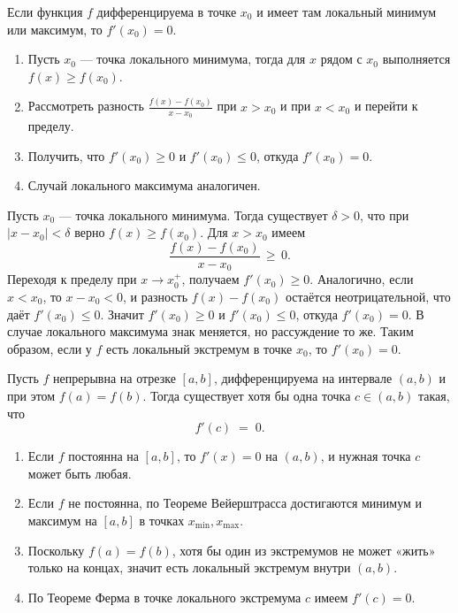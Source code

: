 
\begin{customtheorem}
	Если функция $f$ дифференцируема в точке $x_0$ и имеет там локальный минимум
	или максимум, то $f'(x_0) = 0$.
\end{customtheorem}

\begin{proofplan}
	\begin{enumerate}
		\item Пусть $x_0$ — точка локального минимума, тогда для $x$ рядом с $x_0$ выполняется
		      $f(x)\ge f(x_0)$.
		\item Рассмотреть разность $\frac{f(x)-f(x_0)}{x-x_0}$ при $x>x_0$ и при $x<x_0$
		      и перейти к пределу.
		\item Получить, что $f'(x_0)\ge0$ и $f'(x_0)\le0$, откуда $f'(x_0)=0$.
		\item Случай локального максимума аналогичен.
	\end{enumerate}
\end{proofplan}

\begin{customproof}
	Пусть $x_0$ — точка локального минимума. Тогда существует $\delta>0$, что при
	$|x - x_0| < \delta$ верно $f(x)\ge f(x_0)$. Для $x>x_0$ имеем
	\[
		\frac{f(x) - f(x_0)}{x - x_0}\,\ge\,0.
	\]
	Переходя к пределу при $x \to x_0^+$, получаем $f'(x_0)\ge0$.
	Аналогично, если $x<x_0$, то $x - x_0 < 0$, и разность $f(x) - f(x_0)$ остаётся неотрицательной,
	что даёт $f'(x_0)\le 0$.
	Значит $f'(x_0)\ge0$ и $f'(x_0)\le0$, откуда $f'(x_0)=0$.
	В случае локального максимума знак меняется, но рассуждение то же.
	Таким образом, если у $f$ есть локальный экстремум в точке $x_0$, то $f'(x_0)=0$.
\end{customproof}

\begin{customtheorem}
	Пусть $f$ непрерывна на отрезке $[a,b]$, дифференцируема на интервале $(a,b)$
	и при этом $f(a)=f(b)$. Тогда существует хотя бы одна точка $c\in(a,b)$ такая, что
	\[
		f'(c)\;=\;0.
	\]
\end{customtheorem}

\begin{proofplan}
	\begin{enumerate}
		\item Если $f$ постоянна на $[a,b]$, то $f'(x)=0$ на $(a,b)$, и нужная точка $c$ может быть любая.
		\item Если $f$ не постоянна, по Теореме Вейерштрасса достигаются минимум и максимум
		      на $[a,b]$ в точках $x_{\min}, x_{\max}$.
		\item Поскольку $f(a)=f(b)$, хотя бы один из экстремумов
		      не может «жить» только на концах, значит есть локальный экстремум внутри $(a,b)$.
		\item По Теореме Ферма в точке локального экстремума $c$ имеем $f'(c)=0$.
	\end{enumerate}
\end{proofplan}

